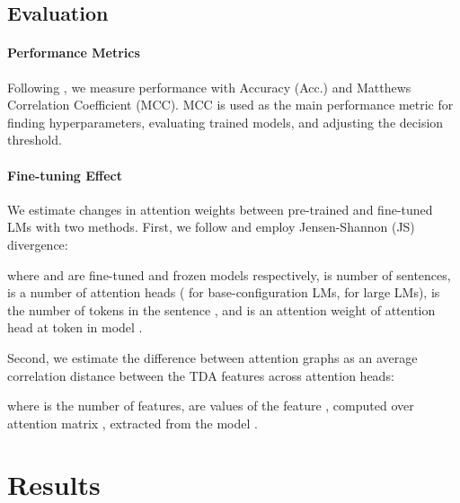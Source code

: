 \documentclass[11pt]{article}
\begin{document}
\subsection{Evaluation}
\label{sec:method_evaluation}
\paragraph{Performance Metrics}
Following \citealp{warstadt-etal-2019-neural}, we measure performance with Accuracy (Acc.) and Matthews Correlation Coefficient (MCC).
MCC is used as the main performance metric for finding hyperparameters, evaluating trained models, and adjusting the decision threshold.
\paragraph{Fine-tuning Effect} 

We estimate changes in attention weights between pre-trained and fine-tuned LMs with two methods. 
First, we follow \citealp{hao-etal-2020-investigating} and employ Jensen-Shannon (JS) divergence:

where  and  are fine-tuned and frozen models respectively,  is number of sentences,
 is a number of attention heads ( for base-configuration LMs,   for large LMs),
 is the number of tokens in the sentence , and  is an attention weight of attention head  at token  in model .

Second, we estimate the difference between attention graphs as an average correlation distance between the TDA features across attention heads:

where  is the number of features,  are values of the  feature , computed over attention matrix , extracted from the model .
\section{Results}
\end{document}
